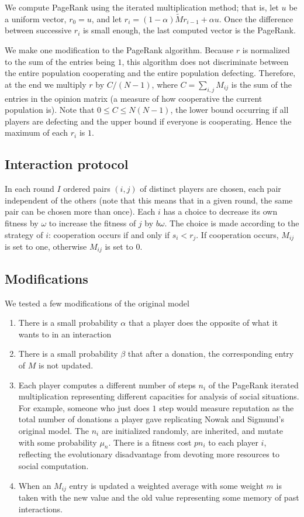 \documentclass{amsart}
\begin{document}
We compute PageRank using the iterated multiplication method; that is,
let $u$ be a uniform vector, $r_0 = u$, and let $r_i =
(1-\alpha)\tilde M r_{i-1} + \alpha u$. Once the difference between
successive $r_i$ is small enough, the last computed vector is the
PageRank.

We make one modification to the PageRank algorithm. Because $r$ is
normalized to the sum of the entries being $1$, this algorithm does
not discriminate between the entire population cooperating and the
entire population defecting. Therefore, at the end we multiply $r$ by
$C/(N-1)$, where $C = \sum_{i,j} M_{ij}$ is the sum of the entries in
the opinion matrix (a measure of how cooperative the current
population is). Note that $0 \le C \le N(N-1)$, the lower bound
occurring if all players are defecting and the upper bound if everyone
is cooperating. Hence the maximum of each $r_i$ is $1$.

\subsection{Interaction protocol}
In each round $I$ ordered pairs $(i,j)$ of distinct players are
chosen, each pair independent of the others (note that this means that
in a given round, the same pair can be chosen more than once). Each
$i$ has a choice to decrease its own fitness by $\omega$ to increase
the fitness of $j$ by $b \omega$. The choice is made according to the
strategy of $i$: cooperation occurs if and only if $s_i < r_j$. If
cooperation occurs, $M_{ij}$ is set to one, otherwise $M_{ij}$ is set
to $0$.

\subsection{Modifications}
We tested a few modifications of the original model
\begin{enumerate}
\item
There is a small probability $\alpha$ that a player does the opposite
of what it wants to in an interaction
\item
There is a small probability $\beta$ that after a donation, the
corresponding entry of $M$ is not updated.
\item
Each player computes a different number of steps $n_i$ of the PageRank
iterated multiplication representing different capacities for analysis
of social situations. For example, someone who just does $1$ step
would measure reputation as the total number of donations a player
gave replicating Nowak and Sigmund's original model. The $n_i$ are
initialized randomly, are inherited, and mutate with some probability
$\mu_n$. There is a fitness cost $p n_i$ to each player $i$,
reflecting the evolutionary disadvantage from devoting more resources
to social computation.
\item
When an $M_{ij}$ entry is updated a weighted average with some weight
$m$ is taken with the new value and the old value representing some
memory of past interactions.
\end{enumerate}
\end{document}
